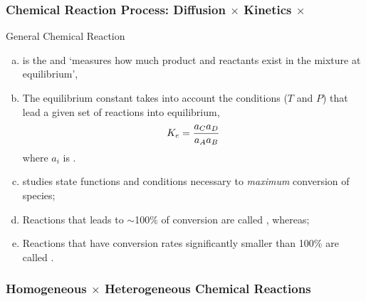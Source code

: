 \documentclass[10pt,compress,handout,unknownkeysallowed]{beamer}
\begin{document}
\begin{frame}
  \frametitle{Chemical Reaction Process: Diffusion $\times$ Kinetics $\times$ }

  \begin{block}{\begin{center}General Chemical Reaction\end{center}}
  \end{block}  
   \begin{enumerate}[a)]
       \item<1->  is the  and `measures how much product and reactants exist in the mixture at equilibrium',
       \item<1-> The equilibrium constant takes into account the conditions ($T$ and $P$) that lead a given set of reactions into equilibrium, \eg
             \begin{displaymath}
                  K_{e} = \displaystyle\frac{a_{C}a_{D}}{a_{A}a_{B}}
             \end{displaymath}
             where $a_{i}$ is . 
       \item<1->  studies state functions and conditions necessary to {\it maximum} conversion of species;
       \item<1-> Reactions that leads to $\sim$100$\%$ of conversion are called , whereas;
       \item<1-> Reactions that have conversion rates significantly smaller than 100$\%$ are called .
   \end{enumerate}
\end{frame}
\normalsize

\begin{frame}
  \frametitle{Homogeneous $\times$ Heterogeneous Chemical Reactions}

\end{frame}
\normalsize
\end{document}
